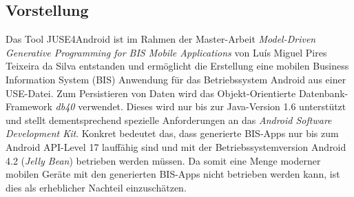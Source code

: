 \documentclass[a4paper,twoside]{article}
\begin{document}


\subsection{Vorstellung}
Das Tool JUSE4Android ist im Rahmen der Master-Arbeit \textit{Model-Driven Generative Programming for BIS Mobile Applications} von Luís Miguel Pires Teixeira da Silva entstanden und ermöglicht die Erstellung eine mobilen Business Information System (BIS) Anwendung für das Betriebssystem Android aus einer USE-Datei. Zum Persistieren von Daten wird das Objekt-Orientierte Datenbank-Framework \textit{db40} verwendet. Dieses wird nur bis zur Java-Version 1.6 unterstützt und stellt dementsprechend spezielle Anforderungen an das \textit{Android Software Development Kit}. Konkret bedeutet das, dass generierte BIS-Apps nur bis zum Android API-Level 17 lauffähig sind und mit der Betriebssystemversion Android 4.2 (\textit{Jelly Bean}) betrieben werden müssen. Da somit eine Menge moderner mobilen Geräte mit den generierten BIS-Apps nicht betrieben werden kann, ist dies als erheblicher Nachteil einzuschätzen.
\end{document}
